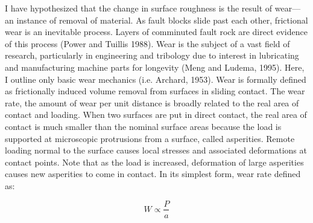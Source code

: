 \documentclass[12pt,a4paper]{article}
\begin{document}
I have hypothesized that the change in surface roughness is the result of wear—an instance of removal of material. As fault blocks slide past each other, frictional wear is an inevitable process. Layers of comminuted fault rock are direct evidence of this process (Power and Tuillis 1988). Wear is the subject of a vast field of research, particularly in engineering and tribology due to interest in lubricating and manufacturing machine parts for longevity (Meng and Ludema, 1995). Here, I outline only basic wear mechanics (i.e. Archard, 1953). Wear is formally defined as frictionally induced volume removal from surfaces in sliding contact. The wear rate, the amount of wear per unit distance is broadly related to the real area of contact and loading. When two surfaces are put in direct contact, the real area of contact is much smaller than the nominal surface areas because the load is supported at microscopic protrusions from a surface, called asperities. Remote loading normal to the surface causes local stresses and associated deformations at contact points. Note that as the load is increased, deformation of large asperities causes new asperities to come in contact. In its simplest form, wear rate defined as:

\begin{equation}
W \varpropto \dfrac{P}{a}
\end{equation}
\end{document}
